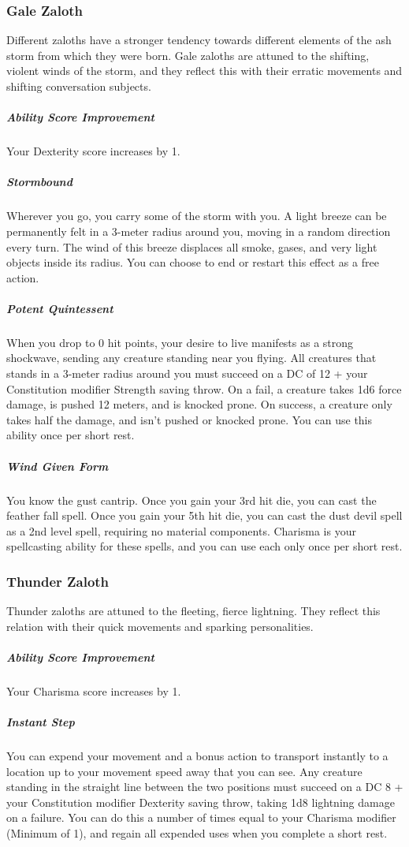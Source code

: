 \subsubsection{Gale Zaloth}
Different zaloths have a stronger tendency towards different elements of the ash storm from which they were born.
Gale zaloths are attuned to the shifting, violent winds of the storm, and they reflect this with their erratic movements and shifting conversation subjects.

\subparagraph{Ability Score Improvement} Your Dexterity score increases by 1.

\subparagraph{Stormbound} Wherever you go, you carry some of the storm with you.
A light breeze can be permanently felt in a 3-meter radius around you, moving in a random direction every turn.
The wind of this breeze displaces all smoke, gases, and very light objects inside its radius.
You can choose to end or restart this effect as a free action.

\subparagraph{Potent Quintessent} When you drop to 0 hit points, your desire to live manifests as a strong shockwave, sending any creature standing near you flying.
All creatures that stands in a 3-meter radius around you must succeed on a DC of 12 + your Constitution modifier Strength saving throw.
On a fail, a creature takes 1d6 force damage, is pushed 12 meters, and is knocked prone.
On success, a creature only takes half the damage, and isn't pushed or knocked prone.
You can use this ability once per short rest.

\subparagraph{Wind Given Form} You know the gust cantrip.
Once you gain your 3rd hit die, you can cast the feather fall spell.
Once you gain your 5th hit die, you can cast the dust devil spell as a 2nd level spell, requiring no material components.
Charisma is your spellcasting ability for these spells, and you can use each only once per short rest.

\subsubsection{Thunder Zaloth}
Thunder zaloths are attuned to the fleeting, fierce lightning.
They reflect this relation with their quick movements and sparking personalities.

\subparagraph{Ability Score Improvement} Your Charisma score increases by 1.

\subparagraph{Instant Step} You can expend your movement and a bonus action to transport instantly to a location up to your movement speed away that you can see.
Any creature standing in the straight line between the two positions must succeed on a DC 8 + your Constitution modifier Dexterity saving throw, taking 1d8 lightning damage on a failure.
You can do this a number of times equal to your Charisma modifier (Minimum of 1), and regain all expended uses when you complete a short rest.

